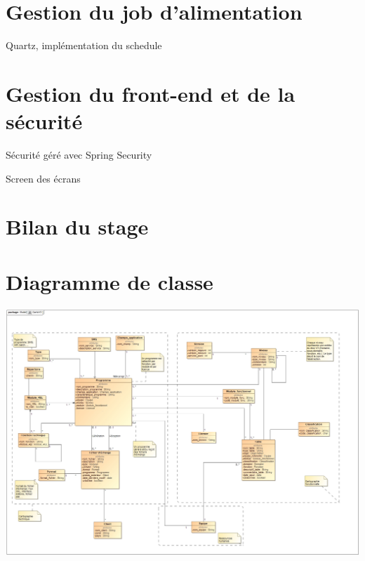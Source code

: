 \documentclass{polytech/polytech}
\begin{document}
\chapter{Gestion du job d'alimentation}

Quartz, implémentation du schedule


\chapter{Gestion du front-end et de la sécurité}

Sécurité géré avec Spring Security

Screen des écrans



\chapter*{Bilan du stage}


\appendix

\chapter{Diagramme de classe}
\label{ann:diagClasse}

\begin{landscape}
	\includegraphics[scale=0.4]{images/CartoV3}
\end{landscape}
\end{document}
